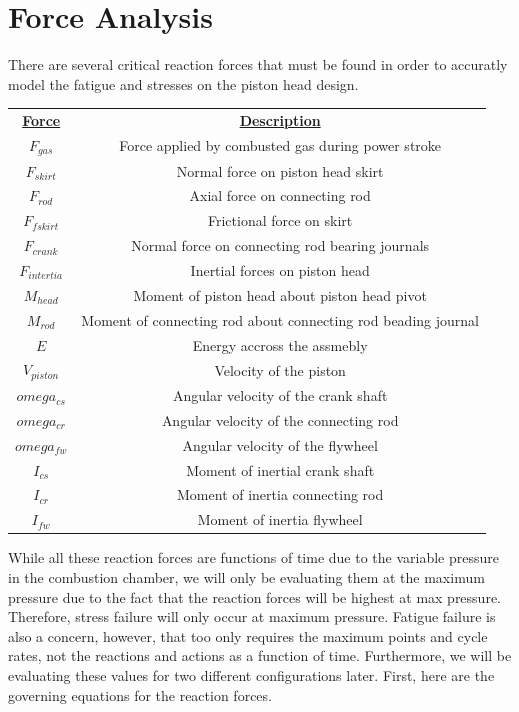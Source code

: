 \documentclass[10pt,a4paper]{article}
\begin{document}
\section{Force Analysis}
There are several critical reaction forces that must be found in order to accuratly model the fatigue and stresses on the piston head design.\\
\begin{center}
\begin{tabular}{ |c|c| } 
 \hline
 \textbf{\underline{Force}} & \textbf{\underline{Description}} \\ 
 $F_{gas}$ & Force applied by combusted gas during power stroke \\ 
 $F_{skirt}$ & Normal force on piston head skirt \\ 
 $F_{rod}$ & Axial force on connecting rod \\ 
 $F_{fskirt}$ & Frictional force on skirt \\
 $F_{crank}$ & Normal force on connecting rod bearing journals \\  
 $F_{intertia}$ & Inertial forces on piston head \\
 $M_{head}$ & Moment of piston head about piston head pivot \\
 $M_{rod}$ & Moment of connecting rod about connecting rod beading journal \\
 $E$ & Energy accross the assmebly\\
 $V_{piston}$ & Velocity of the piston\\
 $omega_{cs}$  & Angular velocity of the crank shaft\\
 $omega_{cr}$ & Angular velocity of the connecting rod\\
 $omega_{fw}$ & Angular velocity of the flywheel\\
 $I_{cs}$ & Moment of inertial crank shaft\\
 $I_{cr}$ & Moment of inertia connecting rod\\ 
 $I_{fw}$ & Moment of inertia flywheel\\
 
 
 
 
 
 
 \hline
\end{tabular}
\end{center}

	While all these reaction forces are functions of time due to the variable pressure in the combustion chamber, we will only be evaluating 
them at the maximum pressure due to the fact that the reaction forces will be highest at max pressure. Therefore, stress failure will only
occur at maximum pressure. Fatigue failure is also a concern, however, that too only requires the maximum points and cycle rates, not the 
reactions and actions as a function of time. Furthermore, we will be evaluating these values for two different configurations later. First, here 
are the governing equations for the reaction forces.\\
\end{document}
